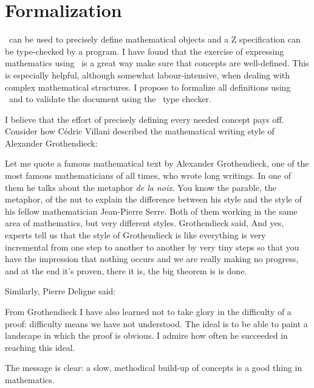 \documentclass[11pt, oneside]{article}
\begin{document}
\section{Formalization}

\Zed\  can be used to precisely define mathematical objects and a Z specification can be type-checked by a program.
I have found that the exercise of expressing mathematics using \Zed\  is a great way make sure that concepts are well-defined.
This is especially helpful, although somewhat labour-intensive, when dealing with complex mathematical structures.
I propose to formalize all definitions using \Zed\  and to validate
the document using the \fuzz\ type checker.

I believe that the effort of precisely defining every needed concept pays off. 
Consider how C\'{e}dric Villani \cite{villani-hbm} described the mathematical writing style of Alexander Grothendieck:
\begin{displayquote}
Let me quote a famous mathematical text by Alexander Grothendieck, 
one of the most famous mathematicians of all times, who wrote long writings.
In one of them he talks about the metaphor \textit{de la noix}.
You know the parable, the metaphor, of the nut
to explain the difference between his style and 
the style of his fellow mathematician Jean-Pierre Serre.
Both of them working in the same area of mathematics, but very different styles. 
Grothendieck said, 
And yes, experts tell us that the style of Grothendieck is like everything is very
incremental from one step to another to
another by very tiny steps so that you
have the impression that nothing occurs
and we are really making no progress, and
at the end it's proven, there it is, the big theorem is is done.
\end{displayquote}
Similarly, Pierre Deligne  \cite{artin-ag1} said:
\begin{displayquote}
From Grothendieck I have also learned not to take glory in the difficulty of a proof: 
difficulty means we have not understood. The ideal is to be able to paint a landscape in which the proof is obvious. 
I admire how often he succeeded in reaching this ideal.
\end{displayquote}
The message is clear: a slow, methodical build-up of concepts is a good thing in mathematics.
\end{document}
